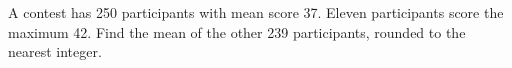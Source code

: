 A contest has 250 participants with mean score 37. Eleven participants score the maximum 42. Find the mean of the other 239 participants, rounded to the nearest integer.
